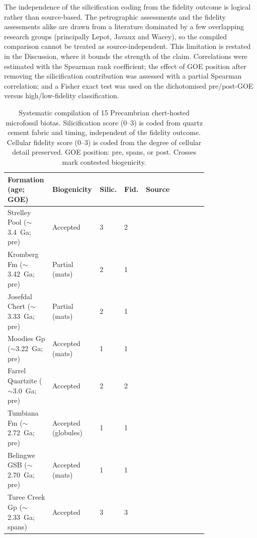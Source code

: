 \documentclass[11pt]{article}
\begin{document}
The independence of the silicification coding from the fidelity outcome is logical rather than
source-based. The petrographic assessments and the fidelity assessments alike are drawn from a
literature dominated by a few overlapping research groups (principally Lepot, Javaux and Wacey), so
the compiled comparison cannot be treated as source-independent. This limitation is restated in the
Discussion, where it bounds the strength of the claim. Correlations were estimated with the Spearman
rank coefficient; the effect of GOE position after removing the silicification contribution was
assessed with a partial Spearman correlation; and a Fisher exact test was used on the dichotomised
pre/post-GOE versus high/low-fidelity classification.

\begin{table}[t]
\centering\footnotesize
\caption{Systematic compilation of 15 Precambrian chert-hosted microfossil biotas. Silicification
score (0--3) is coded from quartz cement fabric and timing, independent of the fidelity outcome.
Cellular fidelity score (0--3) is coded from the degree of cellular detail preserved. GOE position:
pre, spans, or post. Crosses mark contested biogenicity.}
\label{tab:panel}
\setlength{\tabcolsep}{4pt}
\renewcommand{\arraystretch}{1.05}
\begin{tabular}{p{0.205\linewidth}p{0.135\linewidth}p{0.075\linewidth}p{0.075\linewidth}p{0.30\linewidth}}
\toprule
Formation (age; GOE) & Biogenicity & Silic. & Fid. & Source \\
\midrule
Strelley Pool ($\sim$3.4~Ga; pre) & Accepted & 3 & 2 & \citep{Sugitani2010,Delarue2020,Wacey2012} \\
Kromberg Fm ($\sim$3.42~Ga; pre) & Partial (mats) & 2 & 1 & \citep{Javaux2018,Wacey2014} \\
Josefdal Chert ($\sim$3.33~Ga; pre) & Partial (mats) & 2 & 1 & \citep{Javaux2018,Wacey2014} \\
Moodies Gp ($\sim$3.22~Ga; pre) & Accepted (mats) & 1 & 1 & \citep{Homann2015} \\
Farrel Quartzite ($\sim$3.0~Ga; pre) & Accepted & 2 & 2 & \citep{Javaux2018,Wacey2014} \\
Tumbiana Fm ($\sim$2.72~Ga; pre) & Accepted (globules) & 1 & 1 & \citep{Lepot2009,Decraene2021} \\
Belingwe GSB ($\sim$2.70~Ga; pre) & Accepted (mats) & 1 & 1 & \citep{Javaux2018,Wacey2014} \\
Turee Creek Gp ($\sim$2.33~Ga; spans) & Accepted & 3 & 3 & \citep{Lepot2017b,Barlow2018} \\

\end{tabular}
\end{table}
\end{document}
